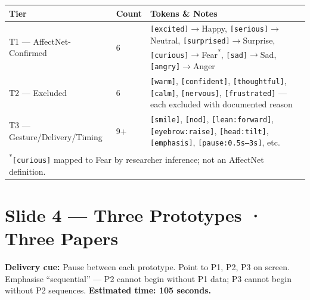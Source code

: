 \documentclass[12pt,a4paper]{article}
\begin{document}
\begin{center}
\begin{tabular}{@{}llp{7cm}@{}}
\toprule
\textbf{Tier} & \textbf{Count} & \textbf{Tokens \& Notes} \\
\midrule
T1 — AffectNet-Confirmed & 6 &
  \texttt{[excited]}$\to$Happy, \texttt{[serious]}$\to$Neutral,
  \texttt{[surprised]}$\to$Surprise, \texttt{[curious]}$\to$Fear\textsuperscript{*},
  \texttt{[sad]}$\to$Sad, \texttt{[angry]}$\to$Anger \\[4pt]
T2 — Excluded & 6 &
  \texttt{[warm]}, \texttt{[confident]}, \texttt{[thoughtful]}, \texttt{[calm]},
  \texttt{[nervous]}, \texttt{[frustrated]} --- each excluded with documented reason \\[4pt]
T3 — Gesture/Delivery/Timing & 9+ &
  \texttt{[smile]}, \texttt{[nod]}, \texttt{[lean:forward]}, \texttt{[eyebrow:raise]},
  \texttt{[head:tilt]}, \texttt{[emphasis]}, \texttt{[pause:0.5s--3s]}, etc. \\
\bottomrule
\multicolumn{3}{l}{\small \textsuperscript{*}\texttt{[curious]} mapped to Fear by researcher inference; not an AffectNet definition.}\\
\end{tabular}
\end{center}

\newpage
\section{Slide 4 --- Three Prototypes · Three Papers}

\begin{cuebox}
\textbf{Delivery cue:} Pause between each prototype. Point to P1, P2, P3 on screen.
Emphasise ``sequential'' --- P2 cannot begin without P1 data; P3 cannot begin without P2 sequences.
\textbf{Estimated time: 105 seconds.}
\end{cuebox}
\end{document}
